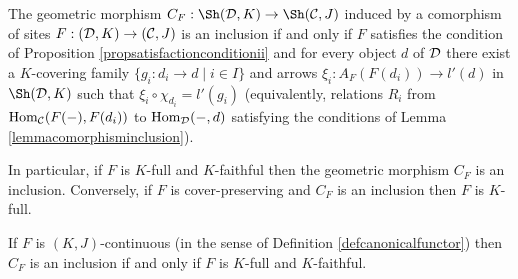 \documentclass[a4paper,12pt]{article}
\begin{document}
\begin{proposition}\label{propinclusioncomoprhismofsites}
	The geometric morphism $C_{F}:\Sh({\cal D}, K)\to \Sh({\cal C}, J)$ induced by a comorphism of sites $F:({\cal D}, K)\to ({\cal C}, J)$ is an inclusion if and only if $F$ satisfies the condition of Proposition \ref{propsatisfactionconditionii} and for every object $d$ of $\cal D$ there exist a $K$-covering family $\{g_{i}:d_{i}\to d \mid i\in I\}$ and arrows $\xi_{i}:A_{F}(F(d_{i}))\to l'(d)$ in $\Sh({\cal D}, K)$ such that $\xi_{i}\circ \chi_{d_{i}}=l'(g_{i})$ (equivalently, relations $R_{i}$ from $\textup{Hom}_{\cal C}(F(-),F(d_{i}))$ to $\textup{Hom}_{\cal D}(-,d)$  satisfying the conditions of Lemma \ref{lemmacomorphisminclusion}). 
	
	In particular, if $F$ is $K$-full and $K$-faithful then the geometric morphism $C_{F}$ is an inclusion. Conversely, if $F$ is cover-preserving and $C_{F}$ is an inclusion then $F$ is $K$-full.
	
	If $F$ is $(K, J)$-continuous (in the sense of Definition \ref{defcanonicalfunctor}) then $C_{F}$ is an inclusion if and only if $F$ is $K$-full and $K$-faithful.
\end{proposition} 
 
\end{document}
